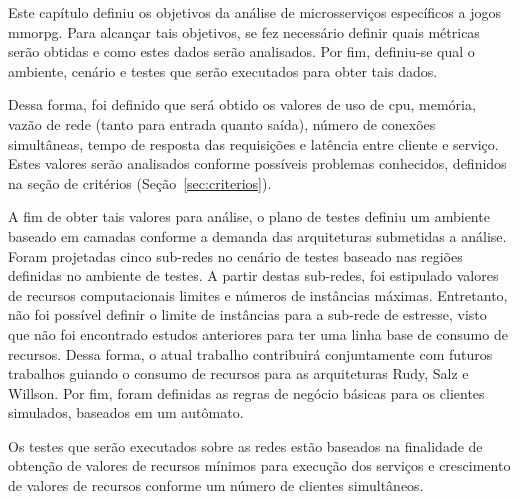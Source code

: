 Este capítulo definiu os objetivos da análise de microsserviços específicos a jogos \ac{mmorpg}.
%
Para alcançar tais objetivos, se fez necessário definir quais métricas serão obtidas e como estes dados serão analisados.
%
Por fim, definiu-se qual o ambiente, cenário e testes que serão executados para obter tais dados.

Dessa forma, foi definido que será obtido os valores de uso de \ac{cpu}, memória, vazão de rede (tanto para entrada quanto saída), número de conexões simultâneas, tempo de resposta das requisições e latência entre cliente e serviço.
%
Estes valores serão analisados conforme possíveis problemas conhecidos, definidos na seção de critérios (Seção~\ref{sec:criterios}).

A fim de obter tais valores para análise, o plano de testes definiu um ambiente baseado em camadas conforme a demanda das arquiteturas submetidas a análise.
%
Foram projetadas cinco sub-redes no cenário de testes baseado nas regiões definidas no ambiente de testes.
%
A partir destas sub-redes, foi estipulado valores de recursos computacionais limites e números de instâncias máximas.
%
Entretanto, não foi possível definir o limite de instâncias para a sub-rede de estresse, visto que não foi encontrado estudos anteriores para ter uma linha base de consumo de recursos.
%
Dessa forma, o atual trabalho contribuirá conjuntamente com futuros trabalhos guiando o consumo de recursos para as arquiteturas Rudy, Salz e Willson.
%
Por fim, foram definidas as regras de negócio básicas para os clientes simulados, baseados em um autômato.

Os testes que serão executados sobre as redes estão baseados na finalidade de obtenção de valores de recursos mínimos para execução dos serviços e crescimento de valores de recursos conforme um número de clientes simultâneos.
